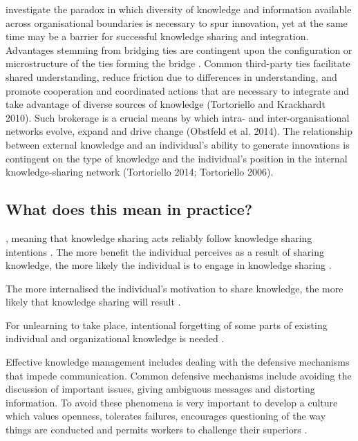 \citet{tortoriello2010activating} investigate the paradox in which diversity of knowledge and information available across organisational boundaries is necessary to spur innovation, yet at the same time may be a barrier for successful knowledge sharing and integration. Advantages stemming from bridging ties are contingent upon the configuration or microstructure of the ties forming the bridge \citep{tortoriello2010activating,tortoriello2015social}. Common third-party ties facilitate shared understanding, reduce friction due to differences in understanding, and promote cooperation and coordinated actions that are necessary to integrate and take advantage of diverse sources of knowledge (Tortoriello and Krackhardt 2010). Such brokerage is a crucial means by which intra- and inter-organisational networks evolve, expand and drive change (Obstfeld et al. 2014). The relationship between external knowledge and an individual’s ability to generate innovations is contingent on the type of knowledge and the individual’s position in the internal knowledge-sharing network (Tortoriello 2014; Tortoriello 2006). 


\subsection{What does this mean in practice?}

, meaning that knowledge sharing acts reliably follow knowledge sharing intentions \citep{witherspoon2013antecedents}. The more benefit the individual perceives as a result of sharing knowledge, the more likely the individual is to engage in knowledge sharing \citep{bock2001breaking,witherspoon2013antecedents}.

The more internalised the individual’s motivation to share knowledge, the more likely that knowledge sharing will result \citep{gagne2009model,witherspoon2013antecedents}.



For unlearning to take place, intentional forgetting of some parts of existing individual and organizational knowledge is needed \citep{rebernik2007fostering}.

Effective knowledge management includes dealing with the defensive mechanisms that impede communication. Common defensive mechanisms include avoiding the discussion of important issues, giving ambiguous messages and distorting information. To avoid these phenomena is very important to develop a culture which values openness, tolerates failures, encourages questioning of the way things are conducted and permits workers to challenge their superiors \citep{lubit2001keys}.




